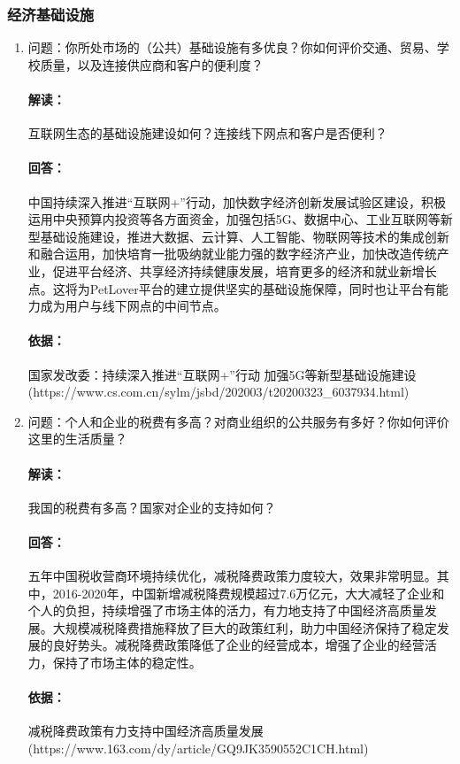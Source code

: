 \documentclass[a4paper]{ctexart}
\begin{document}
\subsubsection{经济基础设施}
\begin{enumerate}[label=\alph*.]
  \item 问题：你所处市场的（公共）基础设施有多优良？你如何评价交通、贸易、学校质量，以及连接供应商和客户的便利度？
  \paragraph{解读：}互联网生态的基础设施建设如何？连接线下网点和客户是否便利？
  \paragraph{回答：}中国持续深入推进“互联网+”行动，加快数字经济创新发展试验区建设，积极运用中央预算内投资等各方面资金，加强包括5G、数据中心、工业互联网等新型基础设施建设，推进大数据、云计算、人工智能、物联网等技术的集成创新和融合运用，加快培育一批吸纳就业能力强的数字经济产业，加快改造传统产业，促进平台经济、共享经济持续健康发展，培育更多的经济和就业新增长点。这将为PetLover平台的建立提供坚实的基础设施保障，同时也让平台有能力成为用户与线下网点的中间节点。
  \paragraph{依据：}国家发改委：持续深入推进“互联网+”行动 加强5G等新型基础设施建设\\(https://www.cs.com.cn/sylm/jsbd/202003/t20200323\_6037934.html)
  \item 问题：个人和企业的税费有多高？对商业组织的公共服务有多好？你如何评价这里的生活质量？
  \paragraph{解读：}我国的税费有多高？国家对企业的支持如何？
  \paragraph{回答：}五年中国税收营商环境持续优化，减税降费政策力度较大，效果非常明显。其中，2016-2020年，中国新增减税降费规模超过7.6万亿元，大大减轻了企业和个人的负担，持续增强了市场主体的活力，有力地支持了中国经济高质量发展。大规模减税降费措施释放了巨大的政策红利，助力中国经济保持了稳定发展的良好势头。减税降费政策降低了企业的经营成本，增强了企业的经营活力，保持了市场主体的稳定性。
  \paragraph{依据：}减税降费政策有力支持中国经济高质量发展\\ (https://www.163.com/dy/article/GQ9JK3590552C1CH.html)
\end{enumerate}
\end{document}
